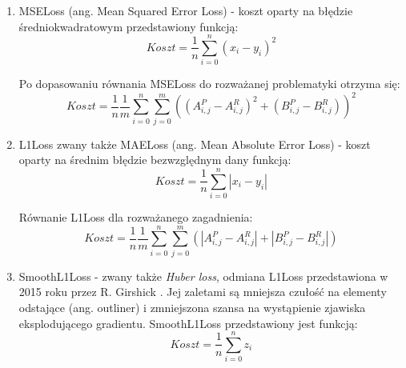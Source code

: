   \begin{enumerate}[leftmargin=*]
  \item MSELoss (ang. Mean Squared Error Loss) - koszt oparty na błędzie średniokwadratowym
  przedstawiony funkcją:
  \begin{equation}
  Koszt = \frac{1}{n}\sum_{i=0}^{n} (x_{i} - y_{i})^2
  \end{equation}


  \noindent
  Po dopasowaniu równania MSELoss do rozważanej problematyki otrzyma się:
  \begin{equation}
  Koszt = \frac{1}{n}\frac{1}{m}\sum_{i=0}^{n}\sum_{j=0}^{m} ((A_{i, j}^{P} - A_{i, j}^{R})^2 + (B_{i, j}^{P} - B_{i, j}^{R}))^2
  \end{equation}


  \item L1Loss zwany także MAELoss (ang. Mean Absolute Error Loss) - koszt oparty na
  średnim błędzie bezwzględnym dany funkcją:
  \begin{equation}
  Koszt = \frac{1}{n}\sum_{i=0}^{n} |x_{i} - y_{i}|
  \end{equation}

  \noindent
  Równanie L1Loss dla rozważanego zagadnienia:
  \begin{equation}
  Koszt = \frac{1}{n}\frac{1}{m}\sum_{i=0}^{n}\sum_{j=0}^{m} (|A_{i, j}^{P} - A_{i, j}^{R}| + |B_{i, j}^{P} - B_{i, j}^{R}|)
  \end{equation}

  \item SmoothL1Loss - zwany także \textit{Huber loss}, odmiana L1Loss przedstawiona w
  2015 roku przez R. Girshick \cite{SmoothL1Loss}. Jej zaletami są mniejsza
  czułość na elementy odstające (ang. outliner) i zmniejszona szansa na wystąpienie
  zjawiska eksplodującego gradientu.
  SmoothL1Loss przedstawiony jest funkcją:
  \begin{equation}
  Koszt = \frac{1}{n}\sum_{i=0}^{n} z_{i}
  \end{equation}


\end{enumerate}
